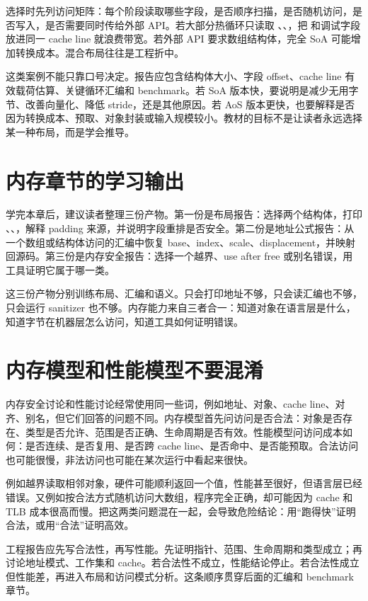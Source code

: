 选择时先列访问矩阵：每个阶段读取哪些字段，是否顺序扫描，是否随机访问，是否写入，是否需要同时传给外部 API。若大部分热循环只读取 、、，把  和调试字段放进同一 cache line 就浪费带宽。若外部 API 要求数组结构体，完全 SoA 可能增加转换成本。混合布局往往是工程折中。

这类案例不能只靠口号决定。报告应包含结构体大小、字段 offset、cache line 有效载荷估算、关键循环汇编和 benchmark。若 SoA 版本快，要说明是减少无用字节、改善向量化、降低 stride，还是其他原因。若 AoS 版本更快，也要解释是否因为转换成本、预取、对象封装或输入规模较小。教材的目标不是让读者永远选择某一种布局，而是学会推导。

\section{内存章节的学习输出}

学完本章后，建议读者整理三份产物。第一份是布局报告：选择两个结构体，打印 、、，解释 padding 来源，并说明字段重排是否安全。第二份是地址公式报告：从一个数组或结构体访问的汇编中恢复 base、index、scale、displacement，并映射回源码。第三份是内存安全报告：选择一个越界、use after free 或别名错误，用工具证明它属于哪一类。

这三份产物分别训练布局、汇编和语义。只会打印地址不够，只会读汇编也不够，只会运行 sanitizer 也不够。内存能力来自三者合一：知道对象在语言层是什么，知道字节在机器层怎么访问，知道工具如何证明错误。

\section{内存模型和性能模型不要混淆}

内存安全讨论和性能讨论经常使用同一些词，例如地址、对象、cache line、对齐、别名，但它们回答的问题不同。内存模型首先问访问是否合法：对象是否存在、类型是否允许、范围是否正确、生命周期是否有效。性能模型问访问成本如何：是否连续、是否复用、是否跨 cache line、是否命中、是否能预取。合法访问也可能很慢，非法访问也可能在某次运行中看起来很快。

例如越界读取相邻对象，硬件可能顺利返回一个值，性能甚至很好，但语言层已经错误。又例如按合法方式随机访问大数组，程序完全正确，却可能因为 cache 和 TLB 成本很高而慢。把这两类问题混在一起，会导致危险结论：用“跑得快”证明合法，或用“合法”证明高效。

工程报告应先写合法性，再写性能。先证明指针、范围、生命周期和类型成立；再讨论地址模式、工作集和 cache。若合法性不成立，性能结论停止。若合法性成立但性能差，再进入布局和访问模式分析。这条顺序贯穿后面的汇编和 benchmark 章节。

